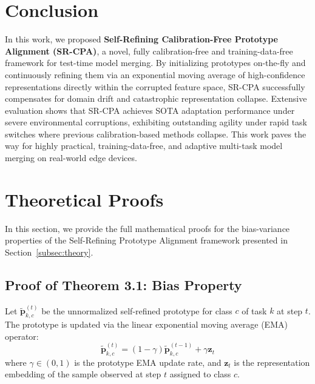 \documentclass{article}
\theoremstyle{plain}
\theoremstyle{definition}
\theoremstyle{remark}
\begin{document}
\section{Conclusion}
\label{sec:conclusion}

In this work, we proposed \textbf{Self-Refining Calibration-Free Prototype Alignment (SR-CPA)}, a novel, fully calibration-free and training-data-free framework for test-time model merging. By initializing prototypes on-the-fly and continuously refining them via an exponential moving average of high-confidence representations directly within the corrupted feature space, SR-CPA successfully compensates for domain drift and catastrophic representation collapse. Extensive evaluation shows that SR-CPA achieves SOTA adaptation performance under severe environmental corruptions, exhibiting outstanding agility under rapid task switches where previous calibration-based methods collapse. This work paves the way for highly practical, training-data-free, and adaptive multi-task model merging on real-world edge devices.




\newpage
\appendix
\onecolumn
\section{Theoretical Proofs}
\label{sec:proofs}

In this section, we provide the full mathematical proofs for the bias-variance properties of the Self-Refining Prototype Alignment framework presented in Section~\ref{subsec:theory}.

\subsection{Proof of Theorem 3.1: Bias Property}
Let $\tilde{\boldsymbol{p}}_{k,c}^{(t)}$ be the unnormalized self-refined prototype for class $c$ of task $k$ at step $t$. The prototype is updated via the linear exponential moving average (EMA) operator:
\begin{equation}
    \tilde{\boldsymbol{p}}_{k,c}^{(t)} = (1 - \gamma) \tilde{\boldsymbol{p}}_{k,c}^{(t-1)} + \gamma \boldsymbol{z}_t
\end{equation}
where $\gamma \in (0,1)$ is the prototype EMA update rate, and $\boldsymbol{z}_t$ is the representation embedding of the sample observed at step $t$ assigned to class $c$.
\end{document}
